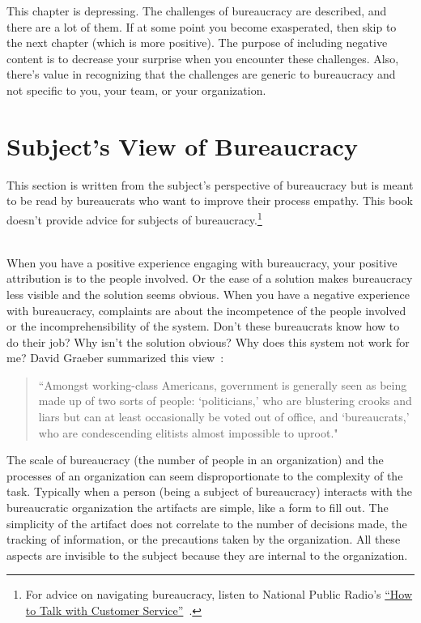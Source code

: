 This chapter is depressing. The challenges of bureaucracy are described, and there are a lot of them. If at some point you become exasperated, then skip to the next chapter (which is more positive). The purpose of including negative content is to decrease your surprise when you encounter these challenges. Also, there's value in recognizing that the challenges are generic to bureaucracy and not specific to you, your team, or your organization. 

\section{Subject's View of Bureaucracy\label{sec:subjects-view}}

This section is written from the subject's perspective of bureaucracy but is meant to be read by bureaucrats who want to improve their \gls{process empathy}. This book doesn't provide advice for subjects of bureaucracy.\footnote{For advice on navigating bureaucracy, listen to National Public Radio's \href{https://www.npr.org/2022/03/16/1086915600/get-what-you-want-customer-service}{``How to Talk with Customer Service''}~\cite{2022_LifeKit}.} 

\ \\

When you have a positive experience engaging with bureaucracy, your positive attribution is to the people involved. Or the ease of a solution makes bureaucracy less visible and the solution seems obvious. 
When you have a negative experience with bureaucracy, complaints are about the incompetence of the people involved or the incomprehensibility of the system. Don't these bureaucrats know how to do their job? Why isn't the solution obvious? Why does this system not work for me? David Graeber summarized this view~\cite{2015_Graeber_regulation}:
\begin{quote}
 ``Amongst working-class Americans, government is generally seen as being made up of two sorts of people: `politicians,' who are blustering crooks and liars but can at least occasionally be voted out of office, and `bureaucrats,' who are condescending elitists almost impossible to uproot."
\end{quote}



The scale of bureaucracy (the number of people in an organization) and the processes of an organization can seem disproportionate to the complexity of the task. Typically when a person (being a subject of bureaucracy) interacts with the bureaucratic organization the artifacts are simple, like a form to fill out. The simplicity of the artifact does not correlate to the number of decisions made, the tracking of information, or the precautions taken by the organization. All these aspects are invisible to the subject because they are internal to the organization.

